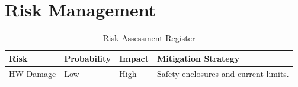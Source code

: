 \section{Risk Management}
\begin{table}[h]
    \centering
    \small
    \begin{tabular}{@{}lllp{9.5cm}@{}}
        \toprule
        \textbf{Risk} & \textbf{Probability} & \textbf{Impact} & \textbf{Mitigation Strategy} \\ \midrule
        HW Damage & Low & High & Safety enclosures and current limits. \\ \bottomrule
    \end{tabular}
    \caption{Risk Assessment Register}
\end{table}
